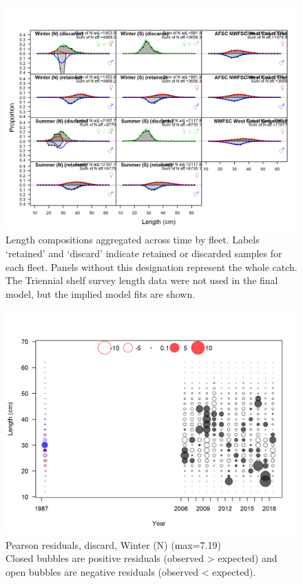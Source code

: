 \documentclass[12pt,]{article}
\begin{document}
\FloatBarrier

\begin{figure}
\centering
\includegraphics{r4ss/plots_mod1/comp_lenfit__aggregated_across_time.png}
\caption{Length compositions aggregated across time by fleet. Labels
`retained' and `discard' indicate retained or discarded samples for each
fleet. Panels without this designation represent the whole catch. The
Triennial shelf survey length data were not used in the final model, but
the implied model fits are shown. \label{fig:length_agg}}
\end{figure}

\FloatBarrier

\begin{figure}
\centering
\includegraphics{r4ss/plots_mod1/comp_lenfit_residsflt1mkt1.png}
\caption{Pearson residuals, discard, Winter (N) (max=7.19)\\
Closed bubbles are positive residuals (observed \textgreater{} expected)
and open bubbles are negative residuals (observed \textless{} expected).
\label{fig:discard_wn_len_pearson}}
\end{figure}
\end{document}
